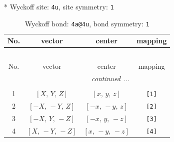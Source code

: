 \documentclass[fleqn,8pt]{jsarticle}
\begin{document}
* Wyckoff site: {\tt 4u}, site symmetry: {\tt 1}
\renewcommand{\arraystretch}{1.2}
\begin{longtable}{cccc}
\caption{Wyckoff bond: {\tt 4a@4u}, bond symmetry: {\tt 1}}
 \\
 \hline \hline
No. & vector & center & mapping \\ \hline \endfirsthead

\multicolumn{3}{l}{\tablename\ \thetable{}} \\
 \hline \hline
No. & vector & center & mapping \\ \hline \endhead

 \hline \hline
\multicolumn{3}{r}{\footnotesize\it continued ...} \\ \endfoot

 \hline \hline
\multicolumn{3}{r}{} \\ \endlastfoot

1 & $\left[ X,\, Y,\, Z \right]$ & $\left[ x,\, y,\, z \right]$ & {\tt [1]} \\ \hline
2 & $\left[ - X,\, - Y,\, Z \right]$ & $\left[ - x,\, - y,\, z \right]$ & {\tt [2]} \\ \hline
3 & $\left[ - X,\, Y,\, - Z \right]$ & $\left[ - x,\, y,\, - z \right]$ & {\tt [3]} \\ \hline
4 & $\left[ X,\, - Y,\, - Z \right]$ & $\left[ x,\, - y,\, - z \right]$ & {\tt [4]} \\
\end{longtable}
\end{document}
